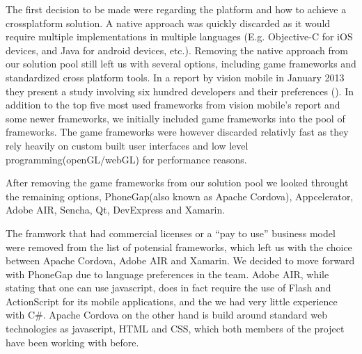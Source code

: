 \bigskip\noindent
	The first decision to be made were regarding the platform and how to achieve a crossplatform solution. 
	A native approach was quickly discarded as it would require multiple implementations in multiple languages (E.g. Objective-C for iOS devices, and Java for android devices, etc.). 
	Removing the native approach from our solution pool still left us with several options, including game frameworks and standardized cross platform tools.
	In a report by vision mobile in January 2013 they present a study involving six hundred developers and their preferences (\cite{developerCPT}). 
	In addition to the top five most used frameworks from vision mobile's report and some newer frameworks, we initially included game frameworks into the pool of frameworks. 
	The game frameworks were however discarded relativly fast as they rely heavily on custom built user interfaces and low level programming(openGL/webGL) for performance reasons.
	
	\bigskip\noindent
	After removing the game frameworks from our solution pool we looked throught the remaining options, PhoneGap(also known as Apache Cordova), Appcelerator, Adobe AIR, Sencha, Qt, DevExpress and Xamarin.
	
	
	\bigskip\noindent
	The framwork that had commercial licenses or a "`pay to use"' business model were removed from the list of potensial frameworks, which left us with the choice between Apache Cordova, Adobe AIR and Xamarin.
	We decided to move forward with PhoneGap due to language preferences in the team. Adobe AIR, while stating that one can use javascript, does in fact require the use of Flash and ActionScript for its mobile applications, and the we had very little experience with C\#.
	Apache Cordova on the other hand is build around standard web technologies as javascript, HTML and CSS, which both members of the project have been working with before.
	
	